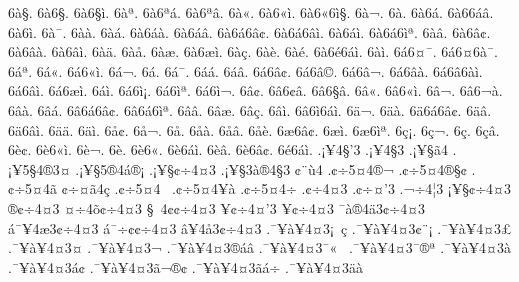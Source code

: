 {6^^e0^^a7. 6^^e06^^a7^^ad. 6^^e06^^a7^^ec. 6^^e0^^aa. 6^^e06^^aa^^e1. 6^^e06^^aa^^e2. 6^^e0^^ab. 6^^e06^^ab^^ec. 
6^^e06^^ab6^^ec^^a7. 6^^e0^^ac. 6^^e0^^ad. 6^^e06^^ad^^e1. 6^^e06^^ad6^^e1^^e2. 6^^e06^^ad^^ec. 6^^e0^^af. 6^^e0^^e0. 
6^^e0^^e1. 6^^e06^^e1^^e0. 6^^e06^^e1^^e2. 6^^e06^^e16^^e2^^a2. 6^^e06^^e16^^e2^^ec. 6^^e06^^e1^^ec. 6^^e06^^e16^^ec^^aa. 6^^e0^^e2. 
6^^e06^^e2^^a2. 6^^e06^^e2^^e0. 6^^e06^^e2^^ec. 6^^e0^^e4. 6^^e0^^e5. 6^^e0^^e6. 6^^e06^^e6^^ec. 6^^e0^^e7. 
6^^e0^^e8. 6^^e0^^e9. 6^^e06^^e96^^e1^^ec. 6^^e0^^ec. 6^^e16^^a4^^af. 6^^e16^^a46^^e0^^af. 6^^e1^^aa. 6^^e1^^ab. 
6^^e16^^ab^^ec. 6^^e1^^ac. 6^^e1^^ad. 6^^e1^^af. 6^^e1^^e1. 6^^e1^^e2. 6^^e16^^e2^^a2. 6^^e16^^e2^^a9. 
6^^e16^^e2^^ac. 6^^e16^^e2^^e0. 6^^e16^^e26^^e0^^ec. 6^^e16^^e2^^ec. 6^^e16^^e6^^ec. 6^^e1^^ec. 6^^e16^^ec^^a1. 6^^e16^^ec^^aa. 
6^^e16^^ec^^ac. 6^^e2^^a2. 6^^e26^^a2^^e2. 6^^e26^^a7^^e2. 6^^e2^^ab. 6^^e26^^ab^^ec. 6^^e2^^ac. 6^^e26^^ac^^e0. 
6^^e2^^e0. 6^^e2^^e1. 6^^e26^^e16^^e2^^a2. 6^^e26^^e16^^ec^^aa. 6^^e2^^e2. 6^^e2^^e6. 6^^e2^^e7. 6^^e2^^ec. 
6^^e26^^ec6^^e1^^ec. 6^^e4^^ac. 6^^e4^^e0. 6^^e46^^e16^^e2^^a2. 6^^e4^^e2. 6^^e46^^e2^^ec. 6^^e4^^e4. 6^^e4^^ec. 
6^^e5^^a2. 6^^e5^^ac. 6^^e5^^ad. 6^^e5^^e0. 6^^e5^^e2. 6^^e5^^e8. 6^^e66^^e2^^a2. 6^^e6^^ec. 
6^^e66^^ec^^aa. 6^^e7^^a1. 6^^e7^^ac. 6^^e7^^ad. 6^^e7^^e2. 6^^e8^^a2. 6^^e86^^ab^^ec. 6^^e8^^ac. 
6^^e8^^ad. 6^^e86^^ad^^ab. 6^^e86^^e1^^ec. 6^^e8^^e2. 6^^e86^^e2^^a2. 6^^e96^^e1^^ec. 
.^^a1^^a54^^a7'3
.^^a1^^a54^^a73
.^^a1^^a5^^a7^^e34
.^^a1^^a55^^a74^^ae3^^a4
.^^a1^^a5^^a75^^ae4^^e1^^ae^^a1
.^^a1^^a5^^a7^^a2^^f74^^a43
.^^a1^^a5^^a73^^e0^^ae4^^a73
^^a2^^a8^^f94
.^^a2^^f75^^a44^^ae^^ac
.^^a2^^f75^^a44^^ae^^a7^^a2
.^^a2^^f75^^a44^^e3^^ad
^^a2^^f7^^a4^^e34^^e7
.^^a2^^f75^^a44^^a0
.^^a2^^f75^^a44^^a5^^e0
.^^a2^^f75^^a44^^f7
.^^a2^^f74^^a43
.^^a2^^f7^^a4'3
.^^ac^^f74^^a63
^^a1^^a5^^a7^^a2^^f74^^a43
^^ae^^a2^^f74^^a43
^^a4^^f74^^f5^^a2^^f74^^a43
^^a7^^a04^^a2^^a2^^f74^^a43
^^ad^^a5^^a2^^f74^^a4'3
^^ad^^a5^^a2^^f74^^a43
^^af^^e0^^ae4^^e43^^a2^^f74^^a43
^^e1^^af^^a54^^e63^^a2^^f74^^a43
^^e1^^af^^f7^^a2^^a2^^f74^^a43
^^e2^^a54^^e53^^a2^^f74^^a43
.^^af^^a5^^e0^^a54^^a43^^a1^^a0^^e7
.^^af^^a5^^e0^^a54^^a43^^a2^^a8^^a1
.^^af^^a5^^e0^^a54^^a43^^a3
.^^af^^a5^^e0^^a54^^a43^^a4
.^^af^^a5^^e0^^a54^^a43^^ac
.^^af^^a5^^e0^^a54^^a43^^ae^^e1^^e2
.^^af^^a5^^e0^^a54^^a43^^af^^ab^^a0
.^^af^^a5^^e0^^a54^^a43^^af^^ae^^aa
.^^af^^a5^^e0^^a54^^a43^^e0
.^^af^^a5^^e0^^a54^^a43^^e1^^a2
.^^af^^a5^^e0^^a54^^a43^^e3^^ac^^ae^^a2
.^^af^^a5^^e0^^a54^^a43^^e3^^e1^^f7
.^^af^^a5^^e0^^a54^^a43^^e4^^e0
}
